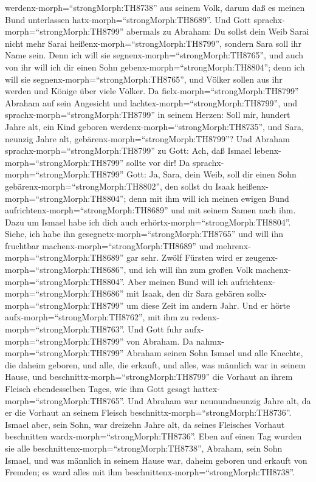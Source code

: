 werdenx-morph=``strongMorph:TH8738'' aus seinem Volk, darum daß es
meinen Bund unterlassen hatx-morph=``strongMorph:TH8689''. 
Und Gott sprachx-morph=``strongMorph:TH8799'' abermals zu Abraham: Du
sollst dein Weib Sarai nicht mehr Sarai
heißenx-morph=``strongMorph:TH8799'', sondern Sara soll ihr Name sein.
 Denn ich will sie segnenx-morph=``strongMorph:TH8765'',
und auch von ihr will ich dir einen Sohn
gebenx-morph=``strongMorph:TH8804''; denn ich will sie
segnenx-morph=``strongMorph:TH8765'', und Völker sollen aus ihr werden
und Könige über viele Völker.  Da
fielx-morph=``strongMorph:TH8799'' Abraham auf sein Angesicht und
lachtex-morph=``strongMorph:TH8799'', und
sprachx-morph=``strongMorph:TH8799'' in seinem Herzen: Soll mir, hundert
Jahre alt, ein Kind geboren werdenx-morph=``strongMorph:TH8735'', und
Sara, neunzig Jahre alt, gebärenx-morph=``strongMorph:TH8799''?
 Und Abraham sprachx-morph=``strongMorph:TH8799'' zu Gott:
Ach, daß Ismael lebenx-morph=``strongMorph:TH8799'' sollte vor dir!
 Da sprachx-morph=``strongMorph:TH8799'' Gott: Ja, Sara,
dein Weib, soll dir einen Sohn gebärenx-morph=``strongMorph:TH8802'',
den sollst du Isaak heißenx-morph=``strongMorph:TH8804''; denn mit ihm
will ich meinen ewigen Bund aufrichtenx-morph=``strongMorph:TH8689'' und
mit seinem Samen nach ihm.  Dazu um Ismael habe ich dich
auch erhörtx-morph=``strongMorph:TH8804''. Siehe, ich habe ihn
gesegnetx-morph=``strongMorph:TH8765'' und will ihn fruchtbar
machenx-morph=``strongMorph:TH8689'' und
mehrenx-morph=``strongMorph:TH8689'' gar sehr. Zwölf Fürsten wird er
zeugenx-morph=``strongMorph:TH8686'', und ich will ihn zum großen Volk
machenx-morph=``strongMorph:TH8804''.  Aber meinen Bund
will ich aufrichtenx-morph=``strongMorph:TH8686'' mit Isaak, den dir
Sara gebären sollx-morph=``strongMorph:TH8799'' um diese Zeit im andern
Jahr.  Und er hörte aufx-morph=``strongMorph:TH8762'', mit
ihm zu redenx-morph=``strongMorph:TH8763''. Und Gott fuhr
aufx-morph=``strongMorph:TH8799'' von Abraham.  Da
nahmx-morph=``strongMorph:TH8799'' Abraham seinen Sohn Ismael und alle
Knechte, die daheim geboren, und alle, die erkauft, und alles, was
männlich war in seinem Hause, und
beschnittx-morph=``strongMorph:TH8799'' die Vorhaut an ihrem Fleisch
ebendesselben Tages, wie ihm Gott gesagt
hattex-morph=``strongMorph:TH8765''.  Und Abraham war
neunundneunzig Jahre alt, da er die Vorhaut an seinem Fleisch
beschnittx-morph=``strongMorph:TH8736''.  Ismael aber, sein
Sohn, war dreizehn Jahre alt, da seines Fleisches Vorhaut beschnitten
wardx-morph=``strongMorph:TH8736''.  Eben auf einen Tag
wurden sie alle beschnittenx-morph=``strongMorph:TH8738'', Abraham, sein
Sohn Ismael,  und was männlich in seinem Hause war, daheim
geboren und erkauft von Fremden; es ward alles mit ihm
beschnittenx-morph=``strongMorph:TH8738''.

